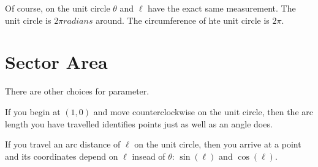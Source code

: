 \documentclass{ximera}
\begin{document}
Of course, on the unit circle $\theta$ and $\ell$ have the exact same measurement.  The unit circle is $2\pi radians$ around.  The circumference of hte unit circle is $2\pi$.




























\section{Sector Area}


There are other choices for parameter.

If you begin at $(1,0)$ and move counterclockwise on the unit circle, then the arc length you have travelled identifies points just as well as an angle does.


If you travel an arc distance of $\ell$ on the unit circle, then you arrive at a point and its coordinates depend on $\ell$ insead of $\theta$: $\sin(\ell)$ and $\cos(\ell)$.
\end{document}
